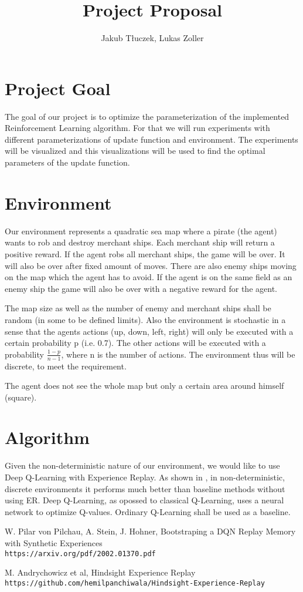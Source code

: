\documentclass[11pt]{article} %
\title{Project Proposal}
\author{Jakub Tłuczek, Lukas Zoller}
\begin{document}
\maketitle

\section{Project Goal}
The goal of our project is to optimize the parameterization of the implemented Reinforcement Learning algorithm. For that we will run experiments with different parameterizations of update function and environment. The experiments will be visualized and this visualizations will be used to find the optimal parameters of the update function.

\section{Environment}
Our environment represents a quadratic sea map where a pirate (the agent) wants to rob and destroy merchant ships. Each merchant ship will return a positive reward. If the agent robs all merchant ships, the game will be over. It will also be over after fixed amount of moves. There are also enemy ships moving on the map which the agent has to avoid. If the agent is on the same field as an enemy ship the game will also be over with a negative reward for the agent.

The map size as well as the number of enemy and merchant ships shall be random (in some to be defined limits). Also the environment is stochastic in a sense that the agents actions (up, down, left, right) will only be executed with a certain probability p (i.e. 0.7). The other actions will be executed with a probability $\frac{1-p}{n-1}$, where n is the number of actions. The environment thus will be discrete, to meet the requirement.

The agent does not see the whole map but only a certain area around himself (square). 

\section{Algorithm}
Given the non-deterministic nature of our environment, we would like to use Deep Q-Learning with Experience Replay. As shown in \cite{pilchau}, in non-deterministic, discrete environments it performs much better than baseline methods without using ER. Deep Q-Learning, as opossed to classical Q-Learning, uses a neural network to optimize Q-values. Ordinary Q-Learning shall be used as a baseline.

\begin{thebibliography}{2}
W. Pilar von Pilchau, A. Stein, J. Hohner, Bootstraping a DQN Replay Memory with Synthetic Experiences\\
\texttt{https://arxiv.org/pdf/2002.01370.pdf}

M. Andrychowicz et al, Hindsight Experience Replay\\
\texttt{https://github.com/hemilpanchiwala/Hindsight-Experience-Replay}
\end{thebibliography}
\end{document}

